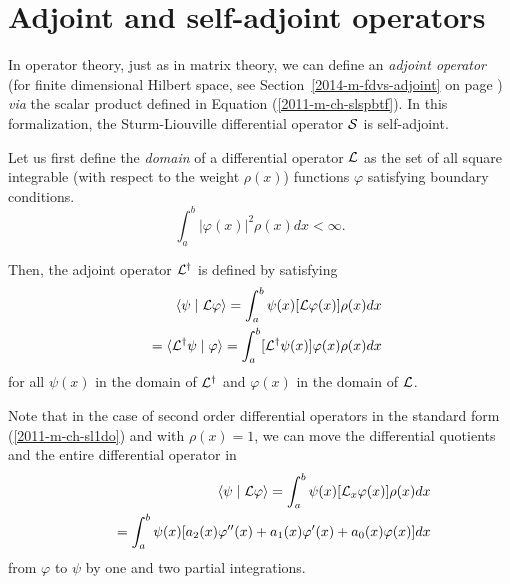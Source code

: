 \section{Adjoint and self-adjoint operators}

In operator theory,
just as in matrix theory,
we can define an
{\em adjoint operator}
(for finite dimensional Hilbert space, see Section~\ref{2014-m-fdvs-adjoint} on page \pageref{2014-m-fdvs-adjoint})
{\it via} the scalar product
defined in Equation (\ref{2011-m-ch-slspbtf}).
In this formalization,
the Sturm-Liouville differential operator ${\cal S}$
is self-adjoint.

Let us first define the
{\em domain}  of a differential operator ${\cal L}$ as the set of all  square integrable
(with respect to the weight  $\rho  (x)$)
functions $\varphi$ satisfying boundary conditions.
\begin{equation}
\int_a^b \vert \varphi (x) \vert^2 \rho  (x) dx < \infty
.
\end{equation}


Then, the adjoint operator  ${\cal L}^\dagger$ is defined by  satisfying
\begin{equation}
\begin{split}
\langle \psi \mid {\cal L} \varphi \rangle
=
\int_a^b
\psi (x) [{\cal L}\varphi (x)]
\rho  (x)         dx
\\
\quad =\langle {\cal L}^\dagger \psi \mid \varphi \rangle
=
\int_a^b
[{\cal L}^\dagger \psi (x)] \varphi (x)
\rho  (x)         dx
\end{split}
\label{2011-m-ch-slspbtfao}
\end{equation}
for all $\psi (x)$ in the domain of ${\cal L}^\dagger$ and $\varphi (x)$ in the domain of ${\cal L}$.

Note that  in the case of second order differential operators
in the standard form (\ref{2011-m-ch-sl1do})  and with $\rho  (x) = 1$,
we can move the differential quotients and the entire differential operator in
\begin{equation}
\begin{split}
\langle \psi \mid {\cal L} \varphi \rangle
=
\int_a^b
\psi (x) [{\cal L}_x\varphi (x)]
\rho  (x)         dx   \\
\qquad =
\int_a^b
\psi (x)
[a_2(x) \varphi''(x) + a_1(x) \varphi'(x) + a_0(x) \varphi (x)]
dx
\end{split}
\label{2011-m-ch-slspbtfao1a}
\end{equation}
from
$\varphi$ to $\psi$
by one and two partial integrations.

